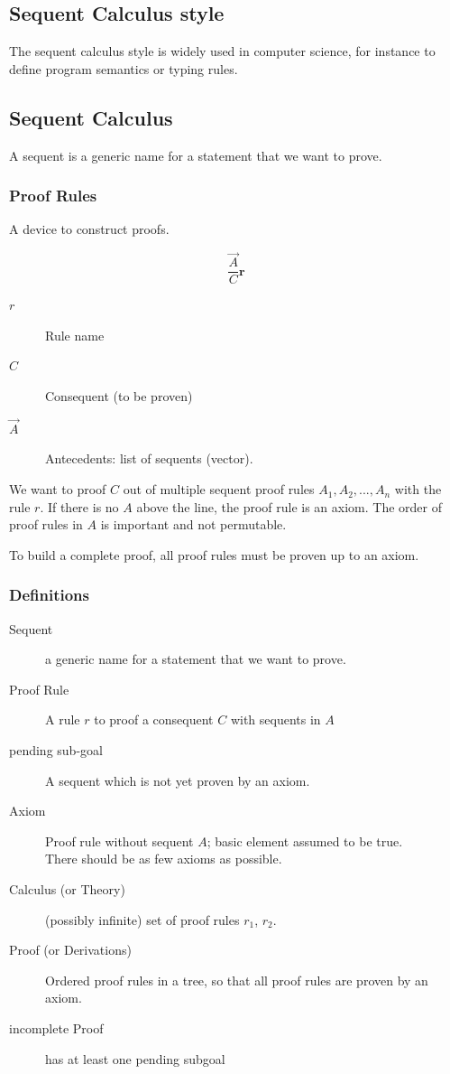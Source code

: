 \subsection{Sequent Calculus style}

The sequent calculus style is widely used in computer science, for instance to define program semantics or typing rules.

\subsection{Sequent Calculus}
A sequent is a generic name for a statement that we want to prove.
\subsubsection{Proof Rules}

 A device to construct proofs.
 
 \[
 \frac{\overrightarrow{A}}{C} \boldsymbol{r}
 \]
 
 \begin{description}
	 	\item[$r$] Rule name
	 	\item[$C$] Consequent (to be proven)
	 	\item[$\vec{A}$] Antecedents: list of sequents (vector).
 	\end{description}
 	
 
 We want to proof $C$ out of multiple sequent proof rules $A_1, A_2, ..., A_n$ with the rule $r$. If there is no $A$ above the line, the proof rule is an axiom. The order of proof rules in $A$ is important and not permutable.
 
 To build a complete proof, all proof rules must be proven up to an axiom.


\subsubsection{Definitions}

\begin{description}
	\item[Sequent] a generic name for a statement that
we want to prove.
	\item[Proof Rule] A rule $r$ to proof a consequent $C$ with sequents in $A$
	\item[pending sub-goal] A sequent which is not yet proven by an axiom.
	\item[Axiom] Proof rule without sequent $A$; basic element assumed to be true. \\
	There should be as few axioms as possible.
	\item[Calculus (or Theory)] (possibly infinite) set of proof rules $r_1$, $r_2$.
	\item[Proof (or Derivations)] Ordered proof rules in a tree, so that all proof rules are proven by an axiom.
	\item[incomplete Proof] has at least one pending subgoal
\end{description}

